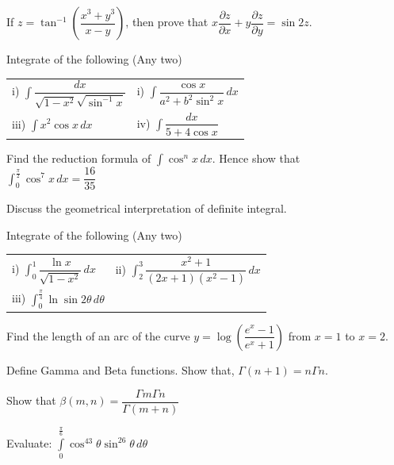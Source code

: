 \documentclass[12pt]{article}
\begin{document}
\begin{itemize}
{\begin{itemize}
{      \item[c)] If $z=\tan^{-1}\left(\dfrac{x^3+y^3}{x-y}\right)$, then prove that $x\dfrac{\partial z}{\partial x}+y\dfrac{\partial z}{\partial y}=\sin 2z$.}
    \end{itemize}
    \item[Q6.] \begin{itemize}
      {\large
      \item[a)] Integrate of the following (Any two)\\
      \begin{tabular}{ll}
          i) $\int \dfrac{dx}{\sqrt{1-x^2}\sqrt{\sin^{-1}x}}$ & i) $\int \dfrac{\cos x}{a^2+b^2 \sin^2x}\,dx$\\
          iii) $\int x^2\cos x\,dx$ & iv) $\int \dfrac{dx}{5+4\cos x}$
      \end{tabular}
      \item[b)]Find the reduction formula of $\int \cos^nx\,dx$. Hence show that\\$\int_0^\frac{\pi}{2}\cos^7x\,dx=\dfrac{16}{35}$}
    \end{itemize}
    \item[Q7.] \begin{itemize}
      {\large
      \item[a)] Discuss the geometrical interpretation of definite integral.
      \item[b)] Integrate of the following (Any two)\\
        \begin{tabular}{ll}
          i) $\int_0^1\dfrac{\ln x}{\sqrt{1-x^2}}\,dx$ & ii) $\int_2^3\dfrac{x^2+1}{(2x+1)(x^2-1)}\,dx$\\
          iii) $\int_0^\frac{\pi}{4}\ln\sin 2\theta\,d\theta$
        \end{tabular}
      \item[c)] Find the length of an arc of the curve $y=\log \left(\dfrac{e^x-1}{e^x+1}\right)$ from $x=1$ to $x=2$.}
    \end{itemize}
    \item[Q8.] \begin{itemize}
      {\large
      \item[a)] Define Gamma and Beta functions. Show that, $\Gamma(n+1)=n\Gamma n$.
      \item[b)] Show that $\beta(m,n)=\dfrac{\Gamma m\Gamma n}{\Gamma(m+n)}$
      \item[c)] Evaluate: $\int \limits_0^{\frac{\pi}{6}}\cos^43\theta\sin^26\theta\,d\theta$}
    \end{itemize}}
  \end{itemize}
\end{document}
